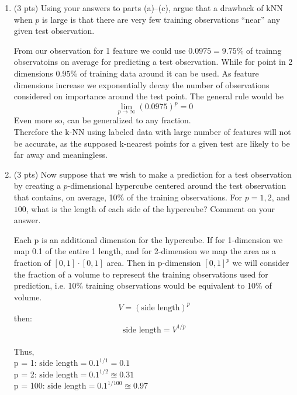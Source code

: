 \documentclass[a4paper]{article}
\theoremstyle{definition}
\newenvironment{soln}{
    \leavevmode\color{blue}\ignorespaces
}{}
\begin{document}
\begin{enumerate}
\begin{enumerate}
          \item (3 pts) Using your answers to parts (a)–(c), argue that a drawback of kNN when $p$ is large is that there are very few training observations “near” any given test observation.

                \begin{soln}
                  From our observation for 1 feature we could use $0.0975 = 9.75\%$ of trainng observatoins on average for predicting a test observation. While for point in 2 dimensions $0.95\%$ of training data around it can be used. As feature dimensions increase we exponentially decay the number of observations considered on importance around the test point. The general rule would be $$\lim_{p\to\infty}(0.0975)^p = 0$$ Even more so, can be generalized to any fraction.
                  \\Therefore the k-NN using labeled data with large number of features will not be accurate, as the supposed k-nearest points for a given test are likely to be far away and meaningless.

                \end{soln}

          \item (3 pts) Now suppose that we wish to make a prediction for a test observation by creating a $p$-dimensional hypercube centered around the test observation that contains, on average, 10\% of the training observations. For $p =1, 2$, and $100$, what is the length of each side of the hypercube? Comment on your answer.

                \begin{soln} Each p is an additional dimension for the hypercube. If for 1-dimension we map 0.1 of the entire 1 length, and for 2-dimension we map the area as a fraction of $[0,1]\cdot[0,1]$ area. Then in p-dimension $[0,1]^p$ we will consider the fraction of a volume to represent the training observations used for prediction, i.e. 10\% training observations would be equivalent to 10\% of volume.
                  $$V = (\text{side length})^p$$ then:
                  $$\text{side length} = V^{1/p}$$
                  \\
                  Thus,\\
                  p = 1:  $\text{side length} = 0.1^{1/1} = 0.1 $\\
                  p = 2:  $\text{side length} = 0.1^{1/2} \approxeq 0.31$\\
                  p = 100:  $\text{side length} = 0.1^{1/100} \approxeq 0.97$
                \end{soln}


\end{enumerate}
\end{enumerate}
\end{document}
